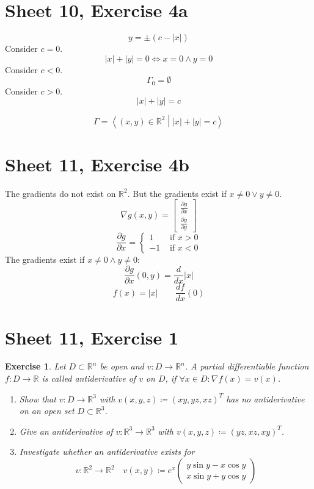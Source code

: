 \documentclass{article}
\newtheorem{ex}{Exercise} %
\newcommand{\angel}[1]{\left\langle#1\right\rangle}
\newcommand{\card}[1]{\left|#1\right|}
\begin{document}
\section{Sheet 10, Exercise 4a}
\[ y = \pm (c - \card{x}) \]
Consider $c = 0$.
\[ \card{x} + \card{y} = 0 \iff x = 0 \land y = 0 \]
Consider $c < 0$.
\[ \Gamma_0 = \emptyset \]
Consider $c > 0$.
\[ \card{x} + \card{y} = c \]

\[ \Gamma = \angel{(x, y) \in \mathbb R^2 \middle| \card{x} + \card{y} = c} \]

\section{Sheet 11, Exercise 4b}

The gradients do not exist on $\mathbb R^2$. But the gradients exist if $x \neq 0 \lor y \neq 0$.
\[ \nabla g(x, y) = \begin{bmatrix} \frac{\partial g}{\partial x} \\ \frac{\partial g}{\partial y} \end{bmatrix} \]
\[ \frac{\partial g}{\partial x} = \begin{cases} 1 & \text{ if } x > 0 \\ -1 & \text{ if } x < 0 \end{cases} \]
The gradients exist if $x \neq 0 \land y \neq 0$:
\[ \frac{\partial g}{\partial x}(0, y) = \frac{d}{dx} \card{x} \]
\[ f(x) = \card{x} \qquad \frac{df}{dx}(0) \]

\section{Sheet 11, Exercise 1}
\begin{ex}
  Let $D \subset \mathbb R^n$ be open and $v: D \to \mathbb R^n$.
  A partial differentiable function $f: D \to \mathbb R$ is called antiderivative of $v$ on $D$,
  if $\forall x \in D: \nabla f(x) = v(x)$.
  \begin{enumerate}
    \item Show that $v: D \to \mathbb R^3$ with $v(x, y, z) \coloneqq (xy, yz, xz)^T$
      has no antiderivative on an open set $D \subset \mathbb R^3$.
    \item Give an antiderivative of $v: \mathbb R^3 \to \mathbb R^3$ with $v(x, y, z) \coloneqq (yz, xz, xy)^T$.
    \item Investigate whether an antiderivative exists for
      \[ v: \mathbb R^2 \to \mathbb R^2 \quad v(x, y) \coloneqq e^x \begin{pmatrix} y \sin{y} - x \cos{y} \\ x \sin{y} + y \cos{y} \end{pmatrix} \]
  \end{enumerate}
\end{ex}
\end{document}

